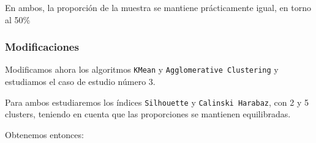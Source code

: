 	En ambos, la proporción de la muestra se mantiene prácticamente igual, en torno al 50\%
	
	
	
	\subsubsection{Modificaciones}
	
	Modificamos ahora los algoritmos \texttt{KMean} y \texttt{Agglomerative Clustering} y estudiamos el caso de estudio número 3.
	
	
	Para ambos estudiaremos los índices \texttt{Silhouette} y \texttt{Calinski Harabaz}, con 2 y 5 clusters, teniendo en cuenta que las proporciones se mantienen equilibradas.
	
	
	\newpage
	Obtenemos entonces:
	
